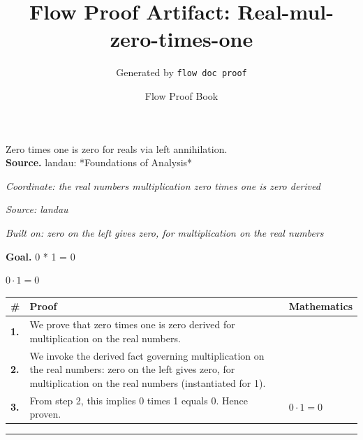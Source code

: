 \documentclass[11pt]{article}
\title{Flow Proof Artifact: Real-mul-zero-times-one}
\author{Generated by \texttt{flow doc proof}}
\date{Flow Proof Book}
\theoremstyle{definition}
\begin{document}
\maketitle
Zero times one is zero for reals via left annihilation.\\[0.5em]
\textbf{Source.} landau: *Foundations of Analysis*\\[0.5em]
\bigskip
{}\par
\smallskip\noindent\textit{Coordinate: the real numbers \cdot multiplication \cdot zero times one is zero derived}\par
\smallskip\noindent\textit{Source: landau}\par
\smallskip\noindent\textit{Built on: zero on the left gives zero, for multiplication on the real numbers}\par
\medskip
\noindent\textbf{Goal.} 0 * 1 = 0\par
\noindent$\displaystyle 0 \cdot 1 = 0$\par
\medskip
\noindent
\begin{tabular}{@{} >{\raggedright\arraybackslash}p{} >{\raggedright\arraybackslash}p{} >{\raggedleft\arraybackslash}p{} @{}}
\textbf{\#} & \textbf{Proof} & \textbf{Mathematics} \\
\midrule
\textbf{1.} & We prove that zero times one is zero derived for multiplication on the real numbers. & \\[0.45em]
\textbf{2.} & We invoke the derived fact governing multiplication on the real numbers: zero on the left gives zero, for multiplication on the real numbers (instantiated for 1). & \\[0.45em]
\textbf{3.} & From step 2, this implies 0 times 1 equals 0. Hence proven. & $\displaystyle 0 \cdot 1 = 0$ \\[0.45em]
\bottomrule
\end{tabular}
\label{thm:Real-multiplication-zero_times_one_is_zero_derived}
\par\medskip\hrule
\end{document}
